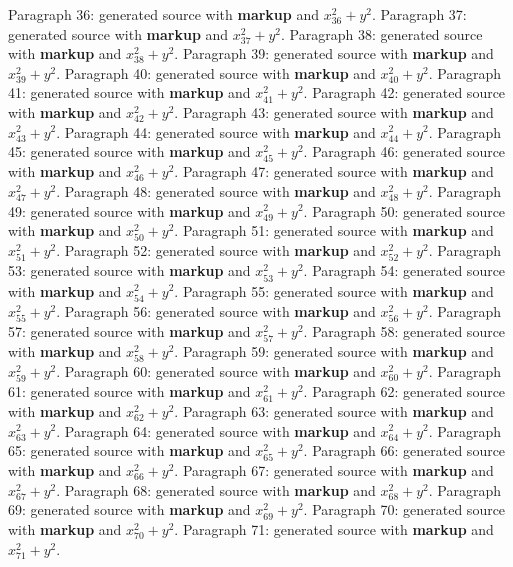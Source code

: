 \documentclass{article}
\begin{document}
Paragraph 36: generated source with \textbf{markup} and $x_{36}^2 + y^2$.
Paragraph 37: generated source with \textbf{markup} and $x_{37}^2 + y^2$.
Paragraph 38: generated source with \textbf{markup} and $x_{38}^2 + y^2$.
Paragraph 39: generated source with \textbf{markup} and $x_{39}^2 + y^2$.
Paragraph 40: generated source with \textbf{markup} and $x_{40}^2 + y^2$.
Paragraph 41: generated source with \textbf{markup} and $x_{41}^2 + y^2$.
Paragraph 42: generated source with \textbf{markup} and $x_{42}^2 + y^2$.
Paragraph 43: generated source with \textbf{markup} and $x_{43}^2 + y^2$.
Paragraph 44: generated source with \textbf{markup} and $x_{44}^2 + y^2$.
Paragraph 45: generated source with \textbf{markup} and $x_{45}^2 + y^2$.
Paragraph 46: generated source with \textbf{markup} and $x_{46}^2 + y^2$.
Paragraph 47: generated source with \textbf{markup} and $x_{47}^2 + y^2$.
Paragraph 48: generated source with \textbf{markup} and $x_{48}^2 + y^2$.
Paragraph 49: generated source with \textbf{markup} and $x_{49}^2 + y^2$.
Paragraph 50: generated source with \textbf{markup} and $x_{50}^2 + y^2$.
Paragraph 51: generated source with \textbf{markup} and $x_{51}^2 + y^2$.
Paragraph 52: generated source with \textbf{markup} and $x_{52}^2 + y^2$.
Paragraph 53: generated source with \textbf{markup} and $x_{53}^2 + y^2$.
Paragraph 54: generated source with \textbf{markup} and $x_{54}^2 + y^2$.
Paragraph 55: generated source with \textbf{markup} and $x_{55}^2 + y^2$.
Paragraph 56: generated source with \textbf{markup} and $x_{56}^2 + y^2$.
Paragraph 57: generated source with \textbf{markup} and $x_{57}^2 + y^2$.
Paragraph 58: generated source with \textbf{markup} and $x_{58}^2 + y^2$.
Paragraph 59: generated source with \textbf{markup} and $x_{59}^2 + y^2$.
Paragraph 60: generated source with \textbf{markup} and $x_{60}^2 + y^2$.
Paragraph 61: generated source with \textbf{markup} and $x_{61}^2 + y^2$.
Paragraph 62: generated source with \textbf{markup} and $x_{62}^2 + y^2$.
Paragraph 63: generated source with \textbf{markup} and $x_{63}^2 + y^2$.
Paragraph 64: generated source with \textbf{markup} and $x_{64}^2 + y^2$.
Paragraph 65: generated source with \textbf{markup} and $x_{65}^2 + y^2$.
Paragraph 66: generated source with \textbf{markup} and $x_{66}^2 + y^2$.
Paragraph 67: generated source with \textbf{markup} and $x_{67}^2 + y^2$.
Paragraph 68: generated source with \textbf{markup} and $x_{68}^2 + y^2$.
Paragraph 69: generated source with \textbf{markup} and $x_{69}^2 + y^2$.
Paragraph 70: generated source with \textbf{markup} and $x_{70}^2 + y^2$.
Paragraph 71: generated source with \textbf{markup} and $x_{71}^2 + y^2$.
\end{document}
